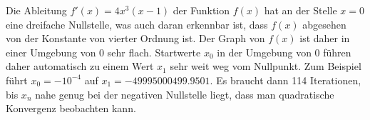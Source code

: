 \begin{loesung}
Die Ableitung $f'(x)=4x^3(x-1)$ der Funktion $f(x)$ hat an der Stelle 
$x=0$ eine dreifache Nullstelle, was auch daran erkennbar ist, dass 
$f(x)$ abgesehen von der Konstante von vierter Ordnung ist.
Der Graph von $f(x)$ ist daher in einer Umgebung von $0$ sehr flach.
Startwerte $x_0$ in der Umgebung von $0$ führen daher automatisch
zu einem Wert $x_1$ sehr weit weg vom Nullpunkt.
Zum Beispiel führt $x_0=-10^{-4}$ auf $x_1=-49995000499.9501$.
Es braucht dann 114 Iterationen, bis $x_n$ nahe genug bei der negativen
Nullstelle liegt, dass man quadratische Konvergenz beobachten kann.
\end{loesung}


